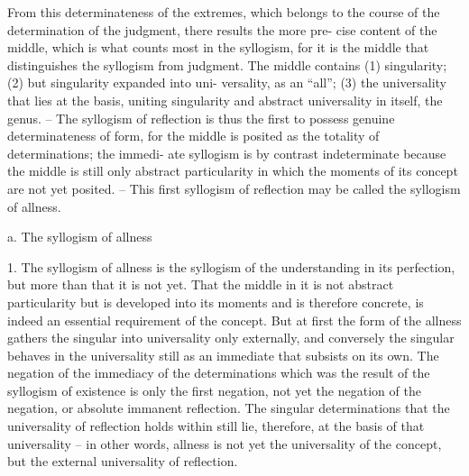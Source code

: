 From this determinateness of the extremes, which belongs to the
course of the determination of the judgment, there results the more pre-
cise content of the middle, which is what counts most in the syllogism,
for it is the middle that distinguishes the syllogism from judgment. The
middle contains (1) singularity; (2) but singularity expanded into uni-
versality, as an “all”; (3) the universality that lies at the basis, uniting
singularity and abstract universality in itself, the genus. – The syllogism
of reflection is thus the first to possess genuine determinateness of form,
for the middle is posited as the totality of determinations; the immedi-
ate syllogism is by contrast indeterminate because the middle is still only
abstract particularity in which the moments of its concept are not yet
posited. – This first syllogism of reflection may be called the syllogism of
allness.

a. The syllogism of allness

1. The syllogism of allness is the syllogism of the understanding in its
perfection, but more than that it is not yet. That the middle in it is not
abstract particularity but is developed into its moments and is therefore
concrete, is indeed an essential requirement of the concept. But at first the
form of the allness gathers the singular into universality only externally, and
conversely the singular behaves in the universality still as an immediate that
subsists on its own. The negation of the immediacy of the determinations
which was the result of the syllogism of existence is only the first negation,
not yet the negation of the negation, or absolute immanent reflection. The
singular determinations that the universality of reflection holds within still
lie, therefore, at the basis of that universality – in other words, allness is
not yet the universality of the concept, but the external universality of
reflection.

